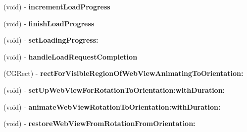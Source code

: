 \begin{DoxyCompactItemize}
\item 
\hypertarget{category_t_o_web_view_controller_07_08_a9bc0a4359526d0a4914819ab77365d61}{}(void) -\/ {\bfseries increment\+Load\+Progress}\label{category_t_o_web_view_controller_07_08_a9bc0a4359526d0a4914819ab77365d61}

\item 
\hypertarget{category_t_o_web_view_controller_07_08_a042e6de11073d2ff47c1f493961bd848}{}(void) -\/ {\bfseries finish\+Load\+Progress}\label{category_t_o_web_view_controller_07_08_a042e6de11073d2ff47c1f493961bd848}

\item 
\hypertarget{category_t_o_web_view_controller_07_08_ad2b0e0f2292b7507e0669abe8990a3a5}{}(void) -\/ {\bfseries set\+Loading\+Progress\+:}\label{category_t_o_web_view_controller_07_08_ad2b0e0f2292b7507e0669abe8990a3a5}

\item 
\hypertarget{category_t_o_web_view_controller_07_08_a467062206e25c56c5e9b1a0e21a8bc36}{}(void) -\/ {\bfseries handle\+Load\+Request\+Completion}\label{category_t_o_web_view_controller_07_08_a467062206e25c56c5e9b1a0e21a8bc36}

\item 
\hypertarget{category_t_o_web_view_controller_07_08_a8d4e1ea7821c73ffa0320d10fbac6ffe}{}(C\+G\+Rect) -\/ {\bfseries rect\+For\+Visible\+Region\+Of\+Web\+View\+Animating\+To\+Orientation\+:}\label{category_t_o_web_view_controller_07_08_a8d4e1ea7821c73ffa0320d10fbac6ffe}

\item 
\hypertarget{category_t_o_web_view_controller_07_08_a7fd59afadae889d49558157e74937735}{}(void) -\/ {\bfseries set\+Up\+Web\+View\+For\+Rotation\+To\+Orientation\+:with\+Duration\+:}\label{category_t_o_web_view_controller_07_08_a7fd59afadae889d49558157e74937735}

\item 
\hypertarget{category_t_o_web_view_controller_07_08_a9129e8f5d5aa050f00b443a8ebaab303}{}(void) -\/ {\bfseries animate\+Web\+View\+Rotation\+To\+Orientation\+:with\+Duration\+:}\label{category_t_o_web_view_controller_07_08_a9129e8f5d5aa050f00b443a8ebaab303}

\item 
\hypertarget{category_t_o_web_view_controller_07_08_a1c27f84fee0af6b24f33018985db41a9}{}(void) -\/ {\bfseries restore\+Web\+View\+From\+Rotation\+From\+Orientation\+:}\label{category_t_o_web_view_controller_07_08_a1c27f84fee0af6b24f33018985db41a9}


\end{DoxyCompactItemize}
